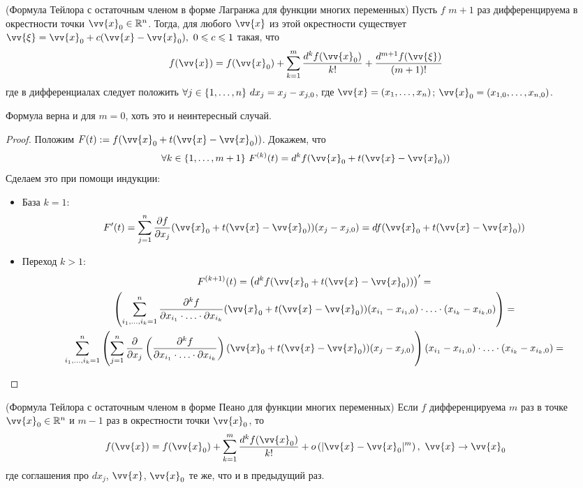\begin{theorem} (Формула Тейлора с остаточным членом в форме Лагранжа для функции многих переменных)
	Пусть $f$ $m + 1$ раз дифференцируема в окрестности точки $\vv{x}_0 \in \R^n$. Тогда, для любого $\vv{x}$ из этой окрестности существует $\vv{\xi} = \vv{x}_0 + c(\vv{x} - \vv{x}_0),\ 0 \le c \le 1$ такая, что
	\[
		f(\vv{x}) = f(\vv{x}_0) + \suml_{k = 1}^m \frac{d^k f(\vv{x}_0)}{k!} + \frac{d^{m + 1} f(\vv{\xi})}{(m + 1)!}
	\]
	где в дифференциалах следует положить $\forall j \in \{1, \ldots, n\}\ dx_j = x_j - x_{j, 0}$, где $\vv{x} = (x_1, \ldots, x_n)$; $\vv{x}_0 = (x_{1, 0}, \ldots, x_{n, 0})$.
\end{theorem}

\begin{note}
	Формула верна и для $m = 0$, хоть это и неинтересный случай.
\end{note}

\begin{proof}
	Положим $F(t) := f(\vv{x}_0 + t(\vv{x} - \vv{x}_0))$. Докажем, что
	\[
		\forall k \in \range{m + 1}\ F^{(k)} (t) = d^k f(\vv{x}_0 + t(\vv{x} - \vv{x}_0))
	\]
	Сделаем это при помощи индукции:
	\begin{itemize}
		\item База $k = 1$:
		\[
			F'(t) = \suml_{j = 1}^n \pd{f}{x_j} (\vv{x}_0 + t(\vv{x} - \vv{x}_0)) (x_j - x_{j, 0}) = df (\vv{x}_0 + t(\vv{x} - \vv{x}_0))
		\]
		\item Переход $k > 1$:
		\begin{multline*}
			F^{(k + 1)}(t) = \left(d^k f(\vv{x}_0 + t(\vv{x} - \vv{x}_0))\right)' =
			\\
			\left(\suml_{i_1, \ldots, i_k  = 1}^n \frac{\vdelta^k f}{\vdelta x_{i_1} \cdot \ldots \cdot \vdelta x_{i_k}} (\vv{x}_0 + t(\vv{x} - \vv{x}_0)) (x_{i_1} - x_{i_1, 0}) \cdot \ldots \cdot (x_{i_k} - x_{i_k, 0})\right) =
			\\
			\suml_{i_1, \ldots, i_k = 1}^n \left(\suml_{j = 1}^n \pd{}{x_j} \left(\frac{\vdelta^k f}{\vdelta x_{i_1} \cdot \ldots \cdot \vdelta{x_{i_k}}}\right) (\vv{x}_0 + t(\vv{x} - \vv{x}_0))(x_j - x_{j, 0})\right) (x_{i_1} - x_{i_1, 0}) \cdot \ldots \cdot (x_{i_k} - x_{i_k, 0}) =
		\end{multline*}
	\end{itemize}
\end{proof}

\begin{theorem} (Формула Тейлора с остаточным членом в форме Пеано для функции многих переменных)
	Если $f$ дифференцируема $m$ раз в точке $\vv{x}_0 \in \R^n$ и $m - 1$ раз в окрестности точки $\vv{x}_0$, то
	\[
		f(\vv{x}) = f(\vv{x}_0) + \suml_{k = 1}^m \frac{d^k f(\vv{x}_0)}{k!} + o\left(|\vv{x} - \vv{x}_0|^m\right),\ \vv{x} \to \vv{x}_0
	\]
	где соглашения про $dx_j$, $\vv{x}$, $\vv{x}_0$ те же, что и в предыдущий раз.
\end{theorem}

